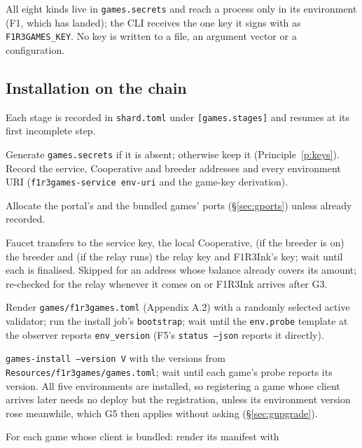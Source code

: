 \documentclass[11pt]{article}
\theoremstyle{definition}
\theoremstyle{remark}
\newcommand{\code}[1]{\texttt{#1}}
\begin{document}
\noindent
All eight kinds live in \code{games.secrets} and reach a process only in its
environment (F1, which has landed); the CLI receives the one key it signs with as
\code{F1R3GAMES\_KEY}. No key is written to a file, an argument vector or a
configuration.

\subsection{Installation on the chain}\label{sec:gstages}

Each stage is recorded in \code{shard.toml} under \code{[games.stages]} and resumes
at its first incomplete step.

\begin{description}[leftmargin=1.5em,style=nextline,itemsep=2pt]
\item[G1 secrets] Generate \code{games.secrets} if it is absent; otherwise keep it
  (Principle~\ref{p:keys}). Record the service, Cooperative and breeder addresses and
  every environment URI (\code{f1r3games-service env-uri} and the game-key
  derivation).
\item[G2 ports] Allocate the portal's and the bundled games' ports
  (\S\ref{sec:gports}) unless already recorded.
\item[G3 fund] Faucet transfers to the service key, the local Cooperative, (if
  the breeder is on) the breeder and (if the relay runs) the relay key and F1R3Ink's
  key; wait until each is finalised. Skipped for an address whose balance already
  covers its amount; re-checked for the relay whenever it comes on or F1R3Ink
  arrives after G3.
\item[G4 configure and install the portal environment] Render
  \code{games/f1r3games.toml} (Appendix A.2) with a randomly selected active
  validator; run the install job's \code{bootstrap}; wait until the \code{env.probe}
  template at the observer reports \code{env\_version} (F5's
  \code{status --json} reports it directly).
\item[G5 install the game environments] \code{games-install --version V} with the
  versions from \code{Resources/f1r3games/games.toml}; wait until each game's probe
  reports its version. All five environments are installed, so registering a game
  whose client arrives later needs no deploy but the registration, unless its
  environment version rose meanwhile, which G5 then applies without asking
  (\S\ref{sec:gupgrade}).
\item[G6 register] For each game whose client is bundled: render its manifest with

\end{description}
\end{document}
